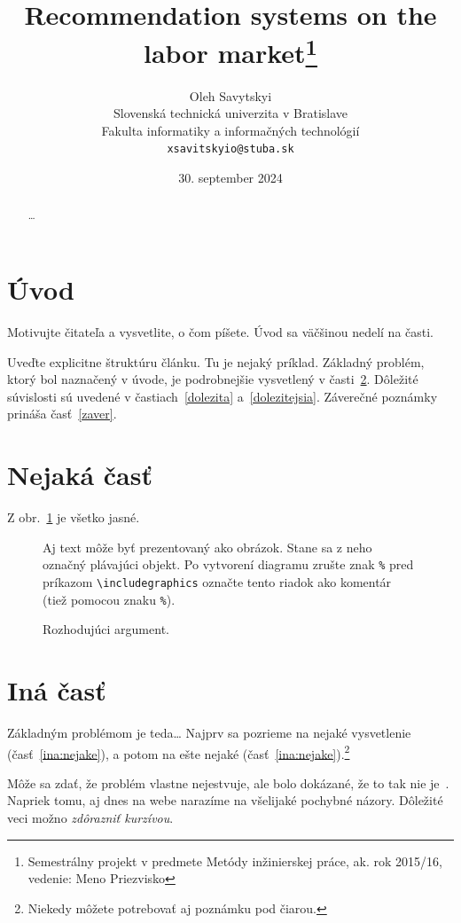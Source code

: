 \documentclass[10pt,twoside,slovak,a4paper]{article}
\title{Recommendation systems on the labor market\thanks{Semestrálny projekt v predmete Metódy inžinierskej práce, ak. rok 2015/16, vedenie: Meno Priezvisko}} %
\author{Oleh Savytskyi\\[2pt]
	{\small Slovenská technická univerzita v Bratislave}\\
	{\small Fakulta informatiky a informačných technológií}\\
	{\small \texttt{xsavitskyio@stuba.sk}}
	}
\date{\small 30. september 2024} %
\begin{document}
\maketitle
\begin{abstract}
\ldots
\end{abstract}



\section{Úvod}

Motivujte čitateľa a vysvetlite, o čom píšete. Úvod sa väčšinou nedelí na časti.

Uveďte explicitne štruktúru článku. Tu je nejaký príklad.
Základný problém, ktorý bol naznačený v úvode, je podrobnejšie vysvetlený v časti~\ref{nejaka}.
Dôležité súvislosti sú uvedené v častiach~\ref{dolezita} a~\ref{dolezitejsia}.
Záverečné poznámky prináša časť~\ref{zaver}.



\section{Nejaká časť} \label{nejaka}

Z obr.~\ref{f:rozhod} je všetko jasné. 

\begin{figure}[tbh]
\centering
Aj text môže byť prezentovaný ako obrázok. Stane sa z neho označný plávajúci objekt. Po vytvorení diagramu zrušte znak \texttt{\%} pred príkazom \verb|\includegraphics| označte tento riadok ako komentár (tiež pomocou znaku \texttt{\%}).
\caption{Rozhodujúci argument.}
\label{f:rozhod}
\end{figure}



\section{Iná časť} \label{ina}



Základným problémom je teda\ldots{} Najprv sa pozrieme na nejaké vysvetlenie (časť~\ref{ina:nejake}), a potom na ešte nejaké (časť~\ref{ina:nejake}).\footnote{Niekedy môžete potrebovať aj poznámku pod čiarou.}

Môže sa zdať, že problém vlastne nejestvuje\cite{Coplien:MPD}, ale bolo dokázané, že to tak nie je~\cite{Czarnecki:Staged, Czarnecki:Progress}. Napriek tomu, aj dnes na webe narazíme na všelijaké pochybné názory\cite{PLP-Framework}. Dôležité veci možno \emph{zdôrazniť kurzívou}.
\end{document}
